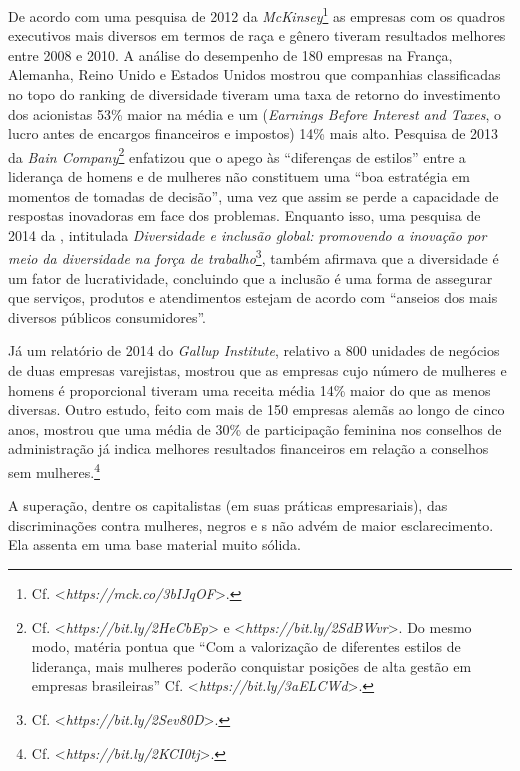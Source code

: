 De acordo com uma pesquisa de 2012 da \emph{McKinsey}\footnote{Cf.
  \textless{}\emph{https://mck.co/3bIJqOF}\textgreater{}.} as
empresas com os quadros executivos mais diversos em termos de raça e
gênero tiveram resultados melhores entre 2008 e 2010. A análise do
desempenho de 180 empresas na França, Alemanha, Reino Unido e Estados
Unidos mostrou que companhias classificadas no topo do ranking de
diversidade tiveram uma taxa de retorno do investimento dos acionistas
53\% maior na média e um  (\emph{Earnings Before Interest and
Taxes}, o lucro antes de encargos financeiros e impostos) 14\% mais
alto. Pesquisa de 2013 da \emph{Bain Company}\footnote{Cf.
  \textless{}\emph{https://bit.ly/2HeCbEp}\textgreater{} %
  e
  \textless{}\emph{https://bit.ly/2SdBWvr}\textgreater{}.
  Do mesmo modo, matéria pontua que ``Com a valorização de diferentes
  estilos de liderança, mais mulheres poderão conquistar posições de
  alta gestão em empresas brasileiras'' Cf.
  \textless{}\emph{https://bit.ly/3aELCWd}\textgreater{}.}
enfatizou que o apego às ``diferenças de estilos'' entre a liderança de
homens e de mulheres não constituem uma ``boa estratégia em momentos de
tomadas de decisão'', uma vez que assim se perde a capacidade de
respostas inovadoras em face dos problemas. Enquanto isso, uma pesquisa
de 2014 da , intitulada \emph{Diversidade e inclusão global:
promovendo a inovação por meio da diversidade na força de
trabalho}\footnote{Cf.
  \textless{}\emph{https://bit.ly/2Sev80D}\textgreater{}.},
também afirmava que a diversidade é um fator de lucratividade,
concluindo que a inclusão é uma forma de assegurar que serviços,
produtos e atendimentos estejam de acordo com ``anseios dos mais
diversos públicos consumidores''.

Já um relatório de 2014 do \emph{Gallup Institute}, relativo a 800
unidades de negócios de duas empresas varejistas, mostrou que as
empresas cujo número de mulheres e homens é proporcional tiveram uma
receita média 14\% maior do que as menos diversas. Outro estudo, feito
com mais de 150 empresas alemãs ao longo de cinco anos, mostrou que uma
média de 30\% de participação feminina nos conselhos de administração já
indica melhores resultados financeiros em relação a conselhos sem
mulheres.\footnote{Cf.
  \textless{}\emph{https://bit.ly/2KCI0tj}\textgreater{}.}

A superação, dentre os capitalistas (em suas práticas empresariais), das
discriminações contra mulheres, negros e s não advém de maior
esclarecimento. Ela assenta em uma base material muito sólida.


